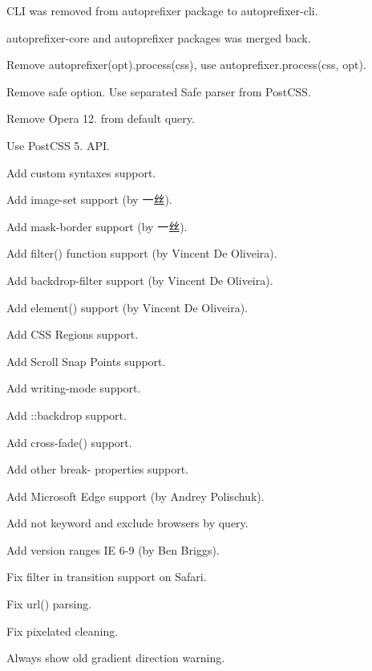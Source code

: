 \begin{DoxyItemize}
\item C\+LI was removed from {\ttfamily autoprefixer} package to {\ttfamily autoprefixer-\/cli}.
\item {\ttfamily autoprefixer-\/core} and {\ttfamily autoprefixer} packages was merged back.
\item Remove {\ttfamily autoprefixer(opt).process(css)}, use {\ttfamily autoprefixer.\+process(css, opt)}.
\item Remove {\ttfamily safe} option. Use separated Safe parser from Post\+C\+SS.
\item Remove Opera 12. from default query.
\item Use Post\+C\+SS 5. A\+PI.
\item Add custom syntaxes support.
\item Add {\ttfamily image-\/set} support (by 一丝).
\item Add {\ttfamily mask-\/border} support (by 一丝).
\item Add {\ttfamily filter()} function support (by Vincent De Oliveira).
\item Add {\ttfamily backdrop-\/filter} support (by Vincent De Oliveira).
\item Add {\ttfamily element()} support (by Vincent De Oliveira).
\item Add C\+SS Regions support.
\item Add Scroll Snap Points support.
\item Add {\ttfamily writing-\/mode} support.
\item Add {\ttfamily \+::backdrop} support.
\item Add {\ttfamily cross-\/fade()} support.
\item Add other {\ttfamily break-\/} properties support.
\item Add Microsoft Edge support (by Andrey Polischuk).
\item Add {\ttfamily not} keyword and exclude browsers by query.
\item Add version ranges {\ttfamily IE 6-\/9} (by Ben Briggs).
\item Fix {\ttfamily filter} in {\ttfamily transition} support on Safari.
\item Fix {\ttfamily url()} parsing.
\item Fix {\ttfamily pixelated} cleaning.
\item Always show old gradient direction warning.
\end{DoxyItemize}

